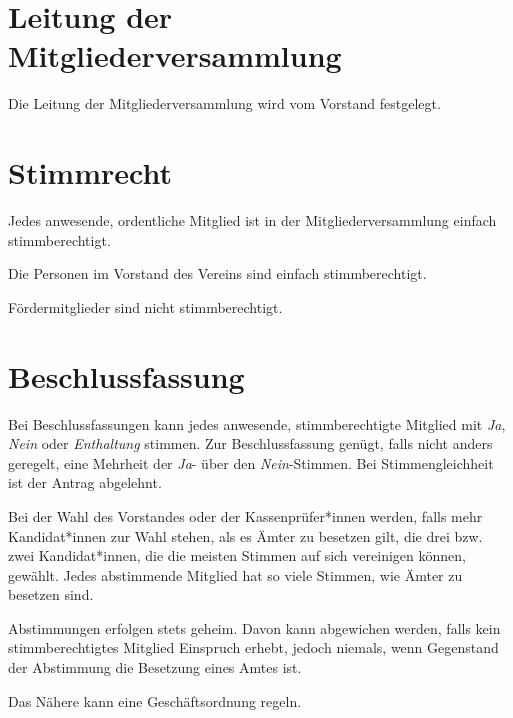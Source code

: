 \section{Leitung der Mitgliederversammlung}
Die Leitung der Mitgliederversammlung wird vom Vorstand festgelegt.

\section{Stimmrecht}
\begin{absätze}
    \item Jedes anwesende, ordentliche Mitglied ist in der Mitgliederversammlung einfach stimmberechtigt.
    \item Die Personen im Vorstand des Vereins sind einfach stimmberechtigt.
    \item Fördermitglieder sind nicht stimmberechtigt.
\end{absätze}

\section{Beschlussfassung}
\begin{absätze}
    \item Bei Beschlussfassungen kann jedes anwesende, stimmberechtigte Mitglied mit \textit{Ja}, \textit{Nein} oder \textit{Enthaltung} stimmen. Zur Beschlussfassung genügt, falls nicht anders geregelt, eine Mehrheit der \textit{Ja}- über den \textit{Nein}-Stimmen. Bei Stimmengleichheit ist der Antrag abgelehnt.
    \item Bei der Wahl des Vorstandes oder der Kassenprüfer*innen werden, falls mehr Kandidat*innen zur Wahl stehen, als es Ämter zu besetzen gilt, die drei bzw. zwei Kandidat*innen, die die meisten Stimmen auf sich vereinigen können, gewählt. Jedes abstimmende Mitglied hat so viele Stimmen, wie Ämter zu besetzen sind.
    \item Abstimmungen erfolgen stets geheim. Davon kann abgewichen werden, falls kein stimmberechtigtes Mitglied Einspruch erhebt, jedoch niemals, wenn Gegenstand der Abstimmung die Besetzung eines Amtes ist.
    \item Das Nähere kann eine Geschäftsordnung regeln.
\end{absätze}

